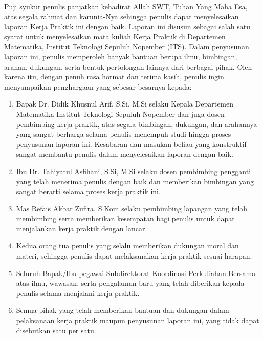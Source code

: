 \documentclass{file/KP-ITS}
\theoremstyle{definition}
\theoremstyle{definition}
\theoremstyle{plain}
\begin{document}

\BagianAwal
\Cover
\LembarJudul
\TitlePage
\LembarPengesahanDepartemen
\LembarPengesahanInstansi
\LembarOrisinalitas

\restoregeometry
\KataPengantar
Puji syukur penulis panjatkan kehadirat Allah SWT, Tuhan Yang Maha Esa, atas segala rahmat dan karunia-Nya sehingga penulis dapat menyelesaikan laporan Kerja Praktik ini dengan baik. Laporan ini disusun sebagai salah satu syarat untuk menyelesaikan mata kuliah Kerja Praktik di Departemen Matematika, Institut Teknologi Sepuluh Nopember (ITS). Dalam penyusunan laporan ini, penulis memperoleh banyak bantuan berupa ilmu, bimbingan, arahan, dukungan, serta bentuk pertolongan lainnya dari berbagai pihak. Oleh karena itu, dengan penuh rasa hormat dan terima kasih, penulis ingin menyampaikan penghargaan yang sebesar-besarnya kepada:

\begin{enumerate}
  \item Bapak Dr. Didik Khusnul Arif, S.Si, M.Si selaku Kepala Departemen Matematika Institut Teknologi Sepuluh Nopember dan juga dosen pembimbing kerja praktik, atas segala bimbingan, dukungan, dan arahannya yang sangat berharga selama penulis menempuh studi hingga proses penyusunan laporan ini. Kesabaran dan masukan beliau yang konstruktif sangat membantu penulis dalam menyelesaikan laporan dengan baik.
  \item Ibu Dr. Tahiyatul Asfihani, S.Si, M.Si selaku dosen pembimbing pengganti yang telah menerima penulis dengan baik dan memberikan bimbingan yang sangat berarti selama proses kerja praktik ini. 
  \item Mas Refais Akbar Zufira, S.Kom selaku pembimbing lapangan yang telah membimbing serta memberikan kesempatan bagi penulis untuk dapat menjalankan kerja praktik dengan lancar.
  \item Kedua orang tua penulis yang selalu memberikan dukungan moral dan materi, sehingga penulis dapat melaksanakan kerja praktik sesuai harapan.
  \item Seluruh Bapak/Ibu pegawai Subdirektorat Koordinasi Perkuliahan Bersama atas ilmu, wawasan, serta pengalaman baru yang telah diberikan kepada penulis selama menjalani kerja praktik.
  \item Semua pihak yang telah memberikan bantuan dan dukungan dalam pelaksanaan kerja praktik maupun penyusunan laporan ini, yang tidak dapat disebutkan satu per satu.
\end{enumerate}
\end{document}
